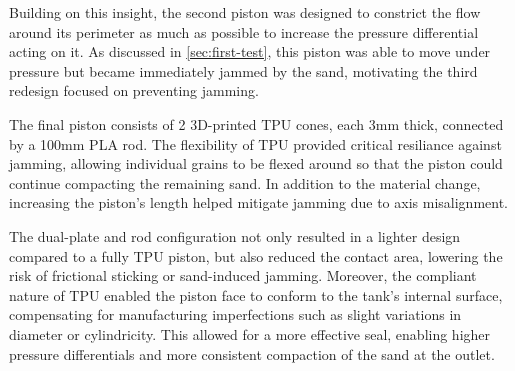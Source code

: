 Building on this insight, the second piston was designed to constrict the flow around its perimeter as much as possible to increase the pressure differential acting on it. As discussed in \autoref{sec:first-test}, this piston was able to move under pressure but became immediately jammed by the sand, motivating the third redesign focused on preventing jamming.

The final piston consists of 2 3D-printed TPU cones, each 3mm thick, connected by a 100mm PLA rod. The flexibility of TPU provided critical resiliance against jamming, allowing individual grains to be flexed around so that the piston could continue compacting the remaining sand. In addition to the material change, increasing the piston's length helped mitigate jamming due to axis misalignment. 

The dual-plate and rod configuration not only resulted in a lighter design compared to a fully TPU piston, but also reduced the contact area, lowering the risk of frictional sticking or sand-induced jamming. Moreover, the compliant nature of TPU enabled the piston face to conform to the tank's internal surface, compensating for manufacturing imperfections such as slight variations in diameter or cylindricity. This allowed for a more effective seal, enabling higher pressure differentials and more consistent compaction of the sand at the outlet.

